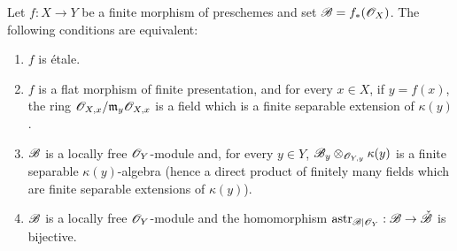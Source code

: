 \begin{proposition}[18.2.3]
\label{IV.18.2.3}
Let $f:X\to Y$ be a finite morphism of preschemes and set $\mathscr{B}=f_*(\mathscr{O}_X)$.
The following conditions are equivalent:
\begin{enumerate}
  \item[a)] $f$ is \'etale.
  \item[a$'$)] $f$ is a flat morphism of finite presentation, and for every $x\in X$, if $y=f(x)$, the ring $\mathscr{O}_{X,x}/\mathfrak{m}_y\mathscr{O}_{X,x}$ is a field which is a finite separable extension of $\kappa(y)$.
  \item[b)] $\mathscr{B}$ is a locally free $\mathscr{O}_Y$-module and, for every $y\in Y$, $\mathscr{B}_y\otimes_{\mathscr{O}_{Y,y}}\kappa(y)$ is a finite separable $\kappa(y)$-algebra (hence a direct product of finitely many fields which are finite separable extensions of $\kappa(y)$).
  \item[c)] $\mathscr{B}$ is a locally free $\mathscr{O}_Y$-module and the homomorphism $\operatorname{astr}_{\mathscr{B}|\mathscr{O}_Y}:\mathscr{B}\to\check{\mathscr{B}}$  is bijective.
\end{enumerate}
\end{proposition}

